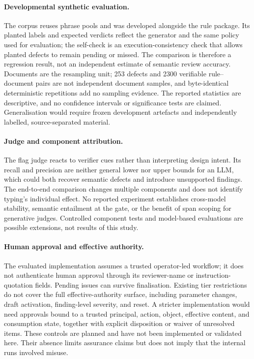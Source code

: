\documentclass[computers,article,submit,moreauthors]{Definitions/mdpi}
\begin{document}
\paragraph{Developmental synthetic evaluation.}
The corpus reuses phrase pools and was developed alongside the rule package. Its planted labels and expected verdicts reflect the generator and the same policy used for evaluation; the self-check is an execution-consistency check that allows planted defects to remain pending or missed. The comparison is therefore a regression result, not an independent estimate of semantic review accuracy. Documents are the resampling unit; 253 defects and 2300 verifiable rule--document pairs are not independent document samples, and byte-identical deterministic repetitions add no sampling evidence. The reported statistics are descriptive, and no confidence intervals or significance tests are claimed. Generalisation would require frozen development artefacts and independently labelled, source-separated material.

\paragraph{Judge and component attribution.}
The flag judge reacts to verifier cues rather than interpreting design intent. Its recall and precision are neither general lower nor upper bounds for an LLM, which could both recover semantic defects and introduce unsupported findings. The end-to-end comparison changes multiple components and does not identify typing's individual effect. No reported experiment establishes cross-model stability, semantic entailment at the gate, or the benefit of span scoping for generative judges. Controlled component tests and model-based evaluations are possible extensions, not results of this study.

\paragraph{Human approval and effective authority.}
The evaluated implementation assumes a trusted operator-led workflow; it does not authenticate human approval through its reviewer-name or instruction-quotation fields. Pending issues can survive finalisation. Existing tier restrictions do not cover the full effective-authority surface, including parameter changes, draft activation, finding-level severity, and reset. A stricter implementation would need approvals bound to a trusted principal, action, object, effective content, and consumption state, together with explicit disposition or waiver of unresolved items. These controls are planned and have not been implemented or validated here. Their absence limits assurance claims but does not imply that the internal runs involved misuse.
\end{document}
